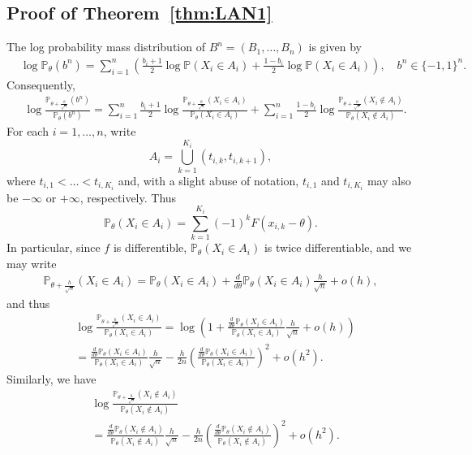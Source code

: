 \documentclass[letterpaper, 11pt]{IEEEtran}      %
\newcommand{\Prob}{\mathbb{P} }
\begin{document}
\subsection{Proof of Theorem~\ref{thm:LAN1}
\label{proof:thm:LAN1}
}
The log probability mass distribution of $B^n=(B_1,\ldots,B_n)$ is given by
\begin{align*}
& \log \Prob_\theta(b^n) = \sum_{i=1}^n \left( \frac{b_i+1}{2} \log  \Prob(X_i\in A_i) + 
\frac{1-b_i}{2} \log \Prob(X_i\in A_i) \right), \quad b^n \in \{-1,1\}^n. 
\end{align*}
Consequently, 
\begin{align}
& \log \frac{ \Prob_{\theta + \frac{h}{\sqrt{n}}}(b^n)} { \Prob_\theta (b^n) } = \sum_{i=1}^n    \frac{b_i+1}{2} 
\log \frac{\Prob_{\theta+\frac{h}{\sqrt{n}}}(X_i \in A_i)}{\Prob_{\theta}(X_i \in A_i)} + 
\sum_{i=1}^n  \frac{1-b_i}{2} 
\log \frac{\Prob_{\theta+\frac{h}{\sqrt{n}}}(X_i \notin A_i)}{\Prob_{\theta}(X_i \notin A_i)}. 
\label{eq:LAN_proof1}
\end{align}
For each $i=1,\ldots,n$, write 
\[
A_i = \bigcup_{k=1}^{K_i} \left(t_{i,k},t_{i,k+1} \right),
\]
where $t_{i,1}<\ldots<t_{i,K_i}$ and, with a slight abuse of notation, $t_{i,1}$ and $t_{i,K_i}$ may also be $-\infty$ or $+\infty$, respectively. Thus
\[
\Prob_{\theta}(X_i \in A_i) = \sum_{k=1}^{K_i} (-1)^k F(x_{i,k}-\theta).
\]
In particular, since $f$ is differentible, $\Prob_{\theta}(X_i \in A_i)$ is twice differentiable, and we may write
\begin{align*}
\Prob_{\theta+\frac{h}{\sqrt{n}}}(X_i \in A_i)  = \Prob_{\theta} (X_i \in A_i) + \frac{d}{d\theta} \Prob_{\theta}(X_i \in A_i) \frac{h}{\sqrt{n}} + o(h), 
\end{align*}
and thus
\begin{align*}
& \log \frac{\Prob_{\theta+\frac{h}{\sqrt{n}}}(X_i \in A_i)}{\Prob_{\theta}(X_i \in A_i)} = \log \left(1 + \frac{\frac{d}{d\theta} \Prob_{\theta}(X_i \in A_i)}{\Prob_{\theta}(X_i \in A_i)}  \frac{h}{\sqrt{n}} + o(h) \right) \\
& = \frac{\frac{d}{d\theta} \Prob_{\theta}(X_i \in A_i)}{\Prob_{\theta}(X_i \in A_i)}  \frac{h}{\sqrt{n}} - \frac{h}{2n} \left( \frac{\frac{d}{d\theta} \Prob_{\theta}(X_i \in A_i)}{\Prob_{\theta}(X_i \in A_i)}  \right)^2 + o(h^2). 
\end{align*}
Similarly, we have
\begin{align*}
& \log \frac{\Prob_{\theta+\frac{h}{\sqrt{n}}}(X_i \notin A_i)}{\Prob_{\theta}(X_i \notin A_i)} \\
& = \frac{\frac{d}{d\theta} \Prob_{\theta}(X_i \notin A_i)}{\Prob_{\theta}(X_i \notin A_i)}  \frac{h}{\sqrt{n}} - \frac{h}{2n} \left( \frac{\frac{d}{d\theta} \Prob_{\theta}(X_i \notin A_i)}{\Prob_{\theta}(X_i \notin A_i)}  \right)^2 + o(h^2). 
\end{align*}
\end{document}
